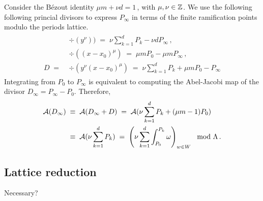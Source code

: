 \documentclass[main.tex]{subfiles}
\begin{document}
    Consider the Bézout identity $\mu m + \nu d = 1$\,, with $\mu,\nu \in \mathbb{Z}$. We use the following following princial divisors to express $P_{\infty}$ in terms of the finite ramification points
    modulo the periods lattice.
    \begin{align}
     \begin{split}
      &\div(y^{\nu}) )\; = \; \nu \sum_{k = 1}^d P_k - \nu d P_{\infty}\,,\\
      &\div((x-x_0)^{\mu}) \; = \; \mu m P_0 - \mu m P_{\infty} \,,\\
      D \; = \; & \div(y^{\nu}(x-x_0)^{\mu}) \; = \;\nu \sum_{k = 1}^d P_k + \mu m P_0 - P_{\infty}  
     \end{split}
    \end{align}
    Integrating from $P_0$ to $P_{\infty}$ is equivalent to computing the Abel-Jacobi map of the divisor $D_{\infty} =  P_{\infty} - P_0 $. Therefore,
    \begin{align}
     \mathcal{A}( D_{\infty} ) \; & \equiv \; \mathcal{A}(D_{\infty} + D) \; = \; \mathcal{A}(  \nu \sum_{k = 1}^d P_k + (\mu m - 1) P_0  ) \\ \; & \equiv \; \mathcal{A}(  \nu \sum_{k = 1}^d P_k  ) 
     \; =  \; \left( \nu \sum_{k=1}^d \int_{P_0}^{P_k} \omega \right)_{w \in W} \mod \Lambda\,.
    \end{align}


    
    
  
  \subsection{Lattice reduction}
  
    Necessary?
      
\biblio
\end{document}
